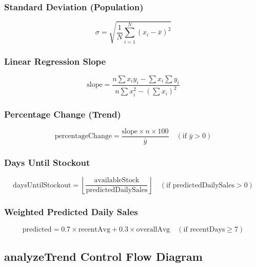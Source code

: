 \documentclass[12pt,onecolumn]{IEEEtran}
\begin{document}
\subsubsection{Standard Deviation (Population)}
\[
  \sigma = \sqrt{\frac{1}{N}\sum_{i=1}^{N}(x_i - \bar{x})^2}
\]

\subsubsection{Linear Regression Slope}
\[
  \text{slope} = \frac{n \sum x_i y_i - \sum x_i \sum y_i}{n \sum x_i^2 - (\sum x_i)^2}
\]

\subsubsection{Percentage Change (Trend)}
\[
  \text{percentageChange} = \frac{\text{slope} \times n \times 100}{\bar{y}} \quad (\text{if } \bar{y} > 0)
\]

\subsubsection{Days Until Stockout}
\[
  \text{daysUntilStockout} = \left\lfloor \frac{\text{availableStock}}{\text{predictedDailySales}} \right\rfloor \quad (\text{if predictedDailySales} > 0)
\]

\subsubsection{Weighted Predicted Daily Sales}
\[
  \text{predicted} = 0.7 \times \text{recentAvg} + 0.3 \times \text{overallAvg} \quad (\text{if recentDays} \geq 7)
\]

\subsection{analyzeTrend Control Flow Diagram}
\end{document}
